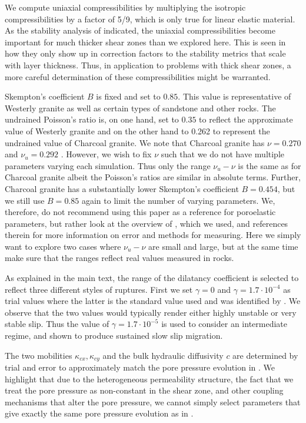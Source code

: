 \documentclass[draft]{agujournal2019}
\begin{document}
We compute uniaxial compressibilities by multiplying the isotropic compressibilities by a factor of 5/9, which is only true for linear elastic material. As the stability analysis of  indicated, the uniaxial compressibilities become important for much thicker shear zones than we explored here. This is seen in how they only show up in
correction factors to the stability metrics that scale with layer thickness. Thus, in application to problems with thick shear zones, a more careful determination of these compressibilities might be warranted. 

Skempton's coefficient $B$ is fixed and set to $0.85$. This value is representative of Westerly granite as well as certain types of sandstone and other rocks. The undrained Poisson's ratio is, on one hand, set to $0.35$ to reflect the approximate value of Westerly granite and on the other hand to 0.262 to represent the undrained value of Charcoal granite. We note that Charcoal granite has $\nu = 0.270$ and $\nu_u = 0.292$ \cite{Cheng2016}. However, we wish to fix $\nu$ such that we do not have multiple parameters varying each simulation. Thus only the range $\nu_u - \nu$ is the same as for Charcoal granite albeit the Poisson's ratios are similar in absolute terms. Further, Charcoal granite has a substantially lower Skempton's coefficient $B = 0.454$, but we still use $B = 0.85$ again to limit the number of varying parameters. We, therefore, do not recommend using this paper as a reference for poroelastic parameters, but rather look at the overview of , which we used, and references therein for more information on error and methods for measuring. Here we simply want to explore two cases where $\nu_u - \nu$ are small and large, but at the same time make sure that the ranges reflect real values measured in rocks.

As explained in the main text, the range of the dilatancy coefficient is selected to reflect three different styles of ruptures. First we set $\gamma = 0$ and $\gamma = 1.7 \cdot 10^{-4}$ as trial values where the latter is the standard value used and was identified by . We observe that the two values would typically render either highly unstable or very stable slip. Thus the value of $\gamma = 1.7 \cdot 10^{-5}$ is used to consider an intermediate regime, and shown to produce sustained slow slip migration.

The two mobilities $\kappa_{cx}, \kappa_{cy}$ and the bulk hydraulic diffusivity $c$ are determined by trial and error to approximately match the pore pressure evolution in . We highlight that due to the heterogeneous permeability structure, the fact that we treat the pore pressure as non-constant in the shear zone, and other coupling mechanisms that alter the pore pressure, we cannot simply select parameters that give exactly the same pore pressure evolution as in .
\end{document}
